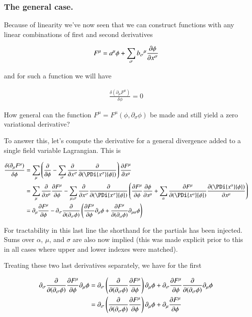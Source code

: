 \documentclass{article}
\begin{document}
\subsubsection{ The general case. }

Because of linearity we've now seen that we can construct functions with
any linear combinations of first and second derivatives

\begin{align*}
F^\mu = a^\mu \phi + \sum_\sigma {b_\sigma}^\mu \frac{\partial {\phi}}{\partial {x^\sigma}}
\end{align*}

and for such a function we will have

\begin{align*}
\frac{\delta (\partial_\mu F^\mu)}{\delta \phi}  = 0
\end{align*}

How general can the function $F^\mu = F^\mu(\phi, \partial_\sigma \phi)$ be 
made and still yield a zero variational derivative?

To answer this, let's compute the derivative for a general divergence 
added to a single field variable Lagrangian.  This is

\begin{align*}
\frac{\delta (\partial_\mu F^\mu)}{\delta \phi} 
&= 
\sum_\mu \left( \PD{\phi}{} 
- \sum_\sigma \PD{x^\sigma}{}\PD{(\PDi{x^\sigma}{\phi})}{} 
\right) \PD{x^\mu}{F^\mu} \\
&= 
\sum_\mu \PD{x^\mu}{} \PD{\phi}{F^\mu} 
- \sum_{\mu,\sigma} \PD{x^\sigma}{}\PD{(\PDi{x^\sigma}{\phi})}{} 
\left(
\PD{\phi}{F^\mu} \PD{x^\mu}{\phi}
+ \sum_\alpha \PD{(\PDi{x^\alpha}{\phi})}{F^\mu} \PD{x^\mu}{(\PDi{x^\alpha}{\phi})} \right) \\
&= 
\partial_\mu \PD{\phi}{F^\mu} 
- \partial_\sigma \PD{(\partial_\sigma \phi)}{} 
\left(
\PD{\phi}{F^\mu} \partial_\mu {\phi}
+ \PD{(\partial_\alpha \phi)}{F^\mu} \partial_{\mu\alpha} \phi \right) \\
\end{align*}

For tractability in this last line the shorthand for the partials has been injected.  
Sums over $\alpha$, $\mu$, and $\sigma$ are also now implied (this was made explicit prior to 
this in all cases where upper and lower indexes were matched).

Treating these two last derivatives separately, we have for the first 

\begin{align*}
\partial_\sigma 
\frac{\partial {}}{\partial {(\partial_\sigma \phi)}} 
\frac{\partial {F^\mu}}{\partial {\phi}} \partial_\mu {\phi}
&=
\partial_\sigma 
\left(\frac{\partial {}}{\partial {(\partial_\sigma \phi)}} \frac{\partial {F^\mu}}{\partial {\phi}} \right) \partial_\mu {\phi}
+
\partial_\sigma 
\frac{\partial {F^\mu}}{\partial {\phi}} \frac{\partial {}}{\partial {(\partial_\sigma \phi)}} \partial_\mu {\phi} \\
&=
\partial_\sigma 
\left(\frac{\partial {}}{\partial {(\partial_\sigma \phi)}} \frac{\partial {F^\mu}}{\partial {\phi}} \right) \partial_\mu {\phi}
+
\partial_\mu \frac{\partial {F^\mu}}{\partial {\phi}}
\end{align*}
\end{document}
